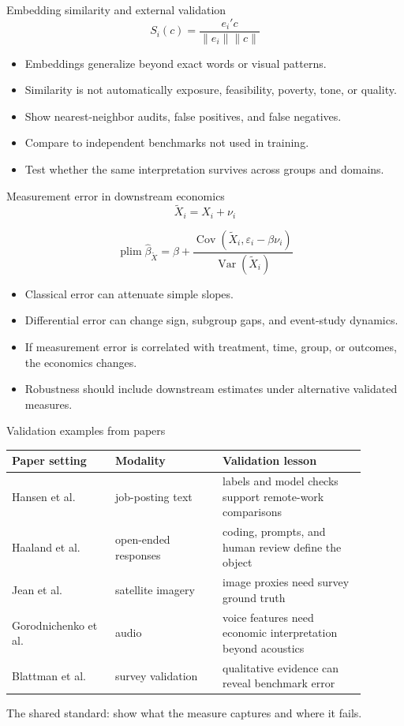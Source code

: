 \documentclass[aspectratio=169,11pt]{beamer}
\newcommand{\1}{\mathbf{1}}
\newcommand{\plim}{\operatorname{plim}}
\begin{document}
\begin{frame}{Embedding similarity and external validation}
\small
\[
S_i(c)=\frac{e_i'c}{\|e_i\|\|c\|}
\]

\begin{itemize}
    \item Embeddings generalize beyond exact words or visual patterns.
    \item Similarity is not automatically exposure, feasibility, poverty, tone, or quality.
    \item Show nearest-neighbor audits, false positives, and false negatives.
    \item Compare to independent benchmarks not used in training.
    \item Test whether the same interpretation survives across groups and domains.
\end{itemize}
\end{frame}

\begin{frame}{Measurement error in downstream economics}
\small
\[
\widetilde X_i=X_i+\nu_i
\]

\[
\plim \widehat\beta_{\widetilde X}
=
\beta
+
\frac{\operatorname{Cov}(\widetilde X_i,\varepsilon_i-\beta\nu_i)}
{\operatorname{Var}(\widetilde X_i)}
\]

\begin{itemize}
    \item Classical error can attenuate simple slopes.
    \item Differential error can change sign, subgroup gaps, and event-study dynamics.
    \item If measurement error is correlated with treatment, time, group, or outcomes, the economics changes.
    \item Robustness should include downstream estimates under alternative validated measures.
\end{itemize}
\end{frame}

\begin{frame}{Validation examples from papers}
\small
\begin{tabular}{p{0.26\linewidth} p{0.27\linewidth} p{0.36\linewidth}}
\toprule
Paper setting & Modality & Validation lesson \\
\midrule
Hansen et al. & job-posting text & labels and model checks support remote-work comparisons \\
Haaland et al. & open-ended responses & coding, prompts, and human review define the object \\
Jean et al. & satellite imagery & image proxies need survey ground truth \\
Gorodnichenko et al. & audio & voice features need economic interpretation beyond acoustics \\
Blattman et al. & survey validation & qualitative evidence can reveal benchmark error \\
\bottomrule
\end{tabular}

\medskip
The shared standard: show what the measure captures and where it fails.
\end{frame}
\end{document}
